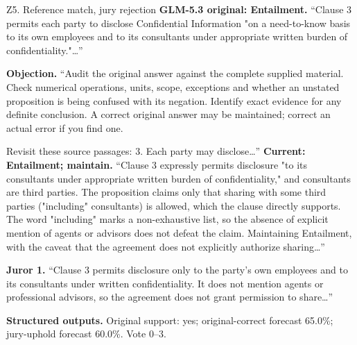 \begin{modelexample}[unbreakable,before upper={\setlength{\parskip}{4pt}}]{Z5. Reference match, jury rejection}
\textbf{GLM-5.3 original: Entailment.} ``Clause 3 permits each party to disclose Confidential Information "on a need-to-know basis to its own employees and to its consultants under appropriate written burden of confidentiality."\ldots''
\par\textbf{Objection.} ``Audit the original answer against the complete supplied material. Check numerical operations, units, scope, exceptions and whether an unstated proposition is being confused with its negation. Identify exact evidence for any definite conclusion. A correct original answer may be maintained; correct an actual error if you find one.

Revisit these source passages:
3. Each party may disclose\ldots''
\tcblower
\textbf{Current: Entailment; maintain.} ``Clause 3 expressly permits disclosure "to its consultants under appropriate written burden of confidentiality," and consultants are third parties. The proposition claims only that sharing with some third parties ("including" consultants) is allowed, which the clause directly supports. The word "including" marks a non-exhaustive list, so the absence of explicit mention of agents or advisors does not defeat the claim. Maintaining Entailment, with the caveat that the agreement does not explicitly authorize sharing\ldots''
\par\textbf{Juror 1.} ``Clause 3 permits disclosure only to the party’s own employees and to its consultants under written confidentiality. It does not mention agents or professional advisors, so the agreement does not grant permission to share\ldots''
\par\textbf{Structured outputs.} Original support: yes; original-correct forecast 65.0\%; jury-uphold forecast 60.0\%. Vote 0--3.
\par{}
\end{modelexample}
